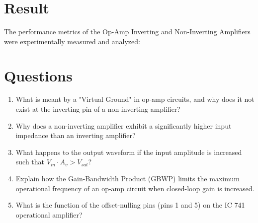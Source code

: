 %

\section{Result}
The performance metrics of the Op-Amp Inverting and Non-Inverting Amplifiers were experimentally measured and analyzed:

\section{Questions}
\begin{enumerate}
	\item What is meant by a "Virtual Ground" in op-amp circuits, and why does it not exist at the inverting pin of a non-inverting amplifier?
	\item Why does a non-inverting amplifier exhibit a significantly higher input impedance than an inverting amplifier?
	\item What happens to the output waveform if the input amplitude is increased such that $V_{in} \cdot A_v > V_{sat}$?
	\item Explain how the Gain-Bandwidth Product (GBWP) limits the maximum operational frequency of an op-amp circuit when closed-loop gain is increased.
	\item What is the function of the offset-nulling pins (pins 1 and 5) on the IC 741 operational amplifier?
\end{enumerate}